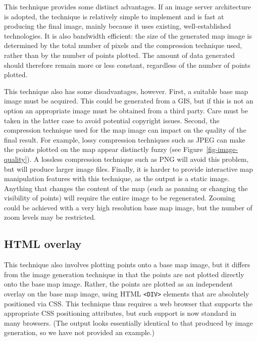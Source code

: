 \documentclass[acmtocl,acmnow]{acmtrans2m}
\begin{document}
This technique provides some distinct advantages. If an image server
architecture is adopted, the technique is relatively simple to implement
and is fast at producing the final image, mainly because it uses
existing, well-established technologies. It is also bandwidth efficient:
the size of the generated map image is determined by the total number of
pixels and the compression technique used, rather than by the number of
points plotted. The amount of data generated should therefore remain
more or less constant, regardless of the number of points plotted.

This technique also has some disadvantages, however. First, a suitable
base map image must be acquired. This could be generated from a GIS, but
if this is not an option an appropriate image must be obtained from a
third party. Care must be taken in the latter case to avoid potential
copyright issues. Second, the compression technique used for the map image
can impact on the quality of the final result. For example, lossy
compression techniques such as JPEG can make the points plotted on the map
appear distinctly fuzzy (see Figure~\ref{fig-image-quality}). A
lossless compression technique such as PNG will avoid this problem, but
will produce larger image files. Finally, it is harder to provide
interactive map manipulation features with this technique, as the output
is a static image. Anything that changes the content of the map (such as
panning or changing the visibility of points) will require the entire
image to be regenerated. Zooming could be achieved with a very high
resolution base map image, but the number of zoom levels may be
restricted.


\subsection{HTML overlay}
\label{sec-html-overlay}


This technique also involves plotting points onto a base map image, but
it differs from the image generation technique in that the points are
not plotted directly onto the base map image. Rather, the points are
plotted as an independent overlay on the base map image, using HTML
\verb|<DIV>| elements that are absolutely positioned via CSS. This
technique thus requires a web browser that supports the appropriate CSS
positioning attributes, but such support is now standard in many
browsers. (The output looks essentially identical to that produced by
image generation, so we have not provided an example.)
\end{document}
